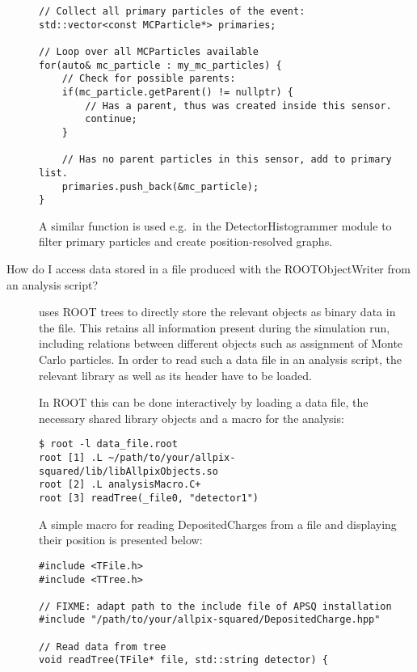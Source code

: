 \begin{description}
\begin{verbatim}
// Collect all primary particles of the event:
std::vector<const MCParticle*> primaries;

// Loop over all MCParticles available
for(auto& mc_particle : my_mc_particles) {
    // Check for possible parents:
    if(mc_particle.getParent() != nullptr) {
        // Has a parent, thus was created inside this sensor.
        continue;
    }

    // Has no parent particles in this sensor, add to primary list.
    primaries.push_back(&mc_particle);
}
\end{verbatim}

A similar function is used e.g.\ in the DetectorHistogrammer module to filter primary particles and create position-resolved graphs.
\item[How do I access data stored in a file produced with the ROOTObjectWriter from an analysis script?]
\apsq uses ROOT trees to directly store the relevant \CPP objects as binary data in the file. This retains all information present during the simulation run, including relations between different objects such as assignment of Monte Carlo particles.
In order to read such a data file in an analysis script, the relevant \CPP library as well as its header have to be loaded.

In ROOT this can be done interactively by loading a data file, the necessary shared library objects and a macro for the analysis:

\begin{verbatim}
$ root -l data_file.root
root [1] .L ~/path/to/your/allpix-squared/lib/libAllpixObjects.so
root [2] .L analysisMacro.C+
root [3] readTree(_file0, "detector1")
\end{verbatim}

A simple macro for reading DepositedCharges from a file and displaying their position is presented below:

\begin{verbatim}
#include <TFile.h>
#include <TTree.h>

// FIXME: adapt path to the include file of APSQ installation
#include "/path/to/your/allpix-squared/DepositedCharge.hpp"

// Read data from tree
void readTree(TFile* file, std::string detector) {


\end{verbatim}
\end{description}
